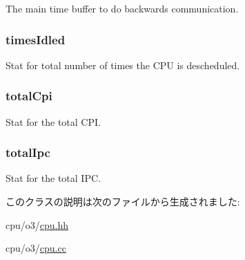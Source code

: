 \label{classFullO3CPU_ad72b6568a4a40f54d071c31bef16bf2e}
The main time buffer to do backwards communication. \hypertarget{classFullO3CPU_a174dbfb3c7b892914a54cec44ed2eeaf}{
\subsubsection[{timesIdled}]{ {\bf timesIdled}}}
\label{classFullO3CPU_a174dbfb3c7b892914a54cec44ed2eeaf}
Stat for total number of times the CPU is descheduled. \hypertarget{classFullO3CPU_a5bd2f06c271dd03138cad92251716f5d}{
\subsubsection[{totalCpi}]{ {\bf totalCpi}}}
\label{classFullO3CPU_a5bd2f06c271dd03138cad92251716f5d}
Stat for the total CPI. \hypertarget{classFullO3CPU_ae8551f10097f4b2e5ed3febf0d9417e3}{
\subsubsection[{totalIpc}]{ {\bf totalIpc}}}
\label{classFullO3CPU_ae8551f10097f4b2e5ed3febf0d9417e3}
Stat for the total IPC. 

このクラスの説明は次のファイルから生成されました:\begin{DoxyCompactItemize}
\item 
cpu/o3/\hyperlink{o3_2cpu_8hh}{cpu.hh}\item 
cpu/o3/\hyperlink{o3_2cpu_8cc}{cpu.cc}\end{DoxyCompactItemize}
